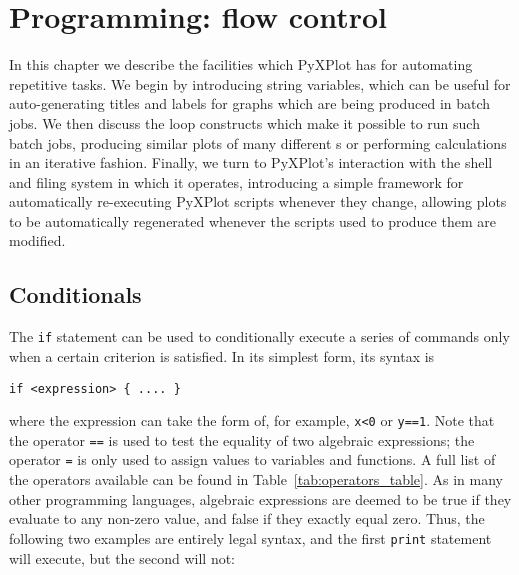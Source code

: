 %
%
%
%
%



\chapter{Programming: flow control}

In this chapter we describe the facilities which PyXPlot has for automating
repetitive tasks. We begin by introducing string variables, which can be useful
for auto-generating titles and labels for graphs which are being produced in
batch jobs. We then discuss the loop constructs which make it possible to run
such batch jobs, producing similar plots of many different \datafile s or
performing calculations in an iterative fashion. Finally, we turn to PyXPlot's
interaction with the shell and filing system in which it operates, introducing
a simple framework for automatically re-executing PyXPlot scripts whenever they
change, allowing plots to be automatically regenerated whenever the scripts
used to produce them are modified.

\section{Conditionals}

The {\tt if} statement can be used to conditionally execute a series
of commands only when a certain criterion is satisfied. In its simplest form,
its syntax is

\begin{verbatim}
if <expression> { .... }
\end{verbatim}

\noindent where the expression can take the form of, for example, {\tt x<0} or
{\tt y==1}. Note that the operator {\tt ==} is used to test the equality of two
algebraic expressions; the operator {\tt =} is only used to assign values to
variables and functions. A full list of the operators available can be found in
Table~\ref{tab:operators_table}. As in many other programming languages,
algebraic expressions are deemed to be true if they evaluate to any non-zero
value, and false if they exactly equal zero. Thus, the following two examples
are entirely legal syntax, and the first {\tt print} statement will execute,
but the second will not:

